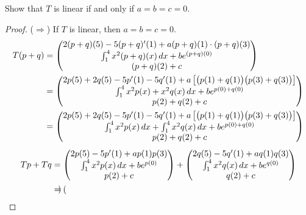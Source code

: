 \documentclass[12pt]{article}
\newcommand{\brac}[1]{\left[ {#1} \right] }
\begin{document}
\begin{enumerate}
\[    \]
    Show that $T$ is linear if and only if $a=b=c=0$.
    \begin{proof} ($\Longrightarrow$) If $T$ is linear, then $a = b = c = 0$.
    \begin{align}
        T(p+q) &= \begin{pmatrix}
            2(p+q)(5)-5(p+q)'(1) + a(p+q)(1)\cdot (p+q)(3) \\
            \int_1^4 x^2 (p+q)(x)\,dx + be^{(p+q)(0)} \\
            (p+q)(2) + c \\ 
        \end{pmatrix}
        \notag\\
        &= \begin{pmatrix}
            2p(5) + 2q(5) -5p'(1) -5q'(1) + a\brac{\big(p(1)+q(1)\big)\big(p(3)+q(3)\big)} \\
            \int_1^4 x^2 p(x)+x^2q(x)\,dx + be^{p(0)+q(0)} \\
            p(2)+q(2) + c \\ 
        \end{pmatrix} \notag\\
        &= \begin{pmatrix}
            2p(5) + 2q(5) -5p'(1) -5q'(1) + a\brac{\big(p(1)+q(1)\big)\big(p(3)+q(3)\big)} \\
            \int_1^4 x^2 p(x)\,dx + \int_1^4 x^2q(x)\,dx + be^{p(0)+q(0)} \\
            p(2)+q(2) + c \\
        \end{pmatrix} \notag
    \end{align}
    \begin{align}
        Tp + Tq &= \begin{pmatrix}
            2p(5)-5p'(1) + ap(1)p(3) \\
            \int_1^4 x^2 p(x)\,dx + be^{p(0)} \\
            p(2) + c \\ 
        \end{pmatrix} + 
        \begin{pmatrix}
            2q(5)-5q'(1) + aq(1)q(3) \\
            \int_1^4 x^2 q(x)\,dx + be^{q(0)} \\
            q(2) + c \\ 
        \end{pmatrix}
        \notag\\
        &= \begin{pmatrix}

\end{pmatrix}
\end{align}
\end{proof}
\end{enumerate}
\end{document}
